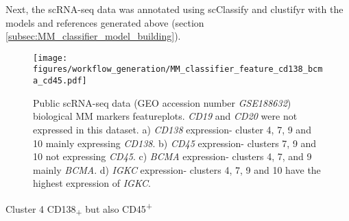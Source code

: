 Next, the scRNA-seq data was annotated using scClassify and clustifyr with the models and references generated above (section \ref{subsec:MM_classifier_model_building}).

\begin{figure}[htb]
\centering
\texttt{[image: figures/workflow\_generation/MM\_classifier\_feature\_cd138\_bcma\_cd45.pdf]}
\caption[Public scRNA-seq data bioligical MM markers featureplots]{Public scRNA-seq data (GEO accession number \textit{GSE188632}) biological MM markers featureplots.
\textit{CD19} and \textit{CD20} were not expressed in this dataset.
a) \textit{CD138} expression- cluster 4, 7, 9 and 10 mainly expressing \textit{CD138}.
b) \textit{CD45} expression- clusters 7, 9 and 10 not expressing \textit{CD45}.
c) \textit{BCMA} expression- clusters 4, 7, and 9 mainly \textit{BCMA}.
d) \textit{IGKC} expression- clusters 4, 7, 9 and 10 have the highest expression of \textit{IGKC}.
}
\label{fig:mm_class_ftp_cd138_cd45_bcma}
\end{figure}
%

Cluster 4 CD138\textsubscript{+} but also CD45\textsuperscript{+}
